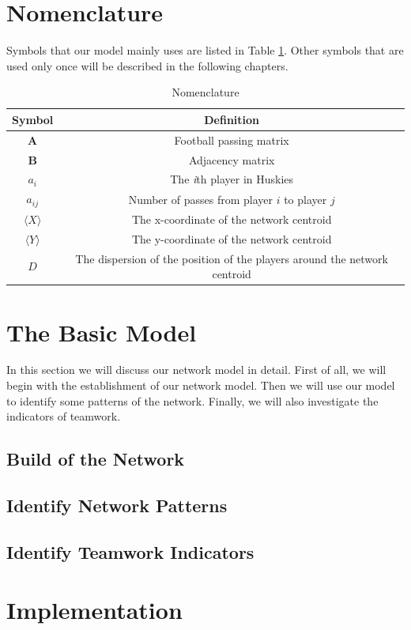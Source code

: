 \documentclass{mcmthesis}
\begin{document}
\section{Nomenclature}
	Symbols that our model mainly uses are listed in Table \ref{tab:Nomen}.  Other symbols that are used only once will be described in the following chapters.
	\begin{table}
    	\centering
    	\caption{Nomenclature}
		\label{tab:Nomen}
		\begin{tabular}{c c}
			\hline
					Symbol & Definition\\
			\hline
				$\textbf{A}$ & Football passing matrix\\
				$\textbf{B}$ & Adjacency matrix\\
				$a_{i}$ & The \emph{i}th player in Huskies\\
				$a_{ij}$ & Number of passes from player $i$ to player $j$\\
				$\langle$$X$$\rangle$ & The x-coordinate of the network centroid\\
				$\langle$$Y$$\rangle$ & The y-coordinate of the network centroid\\
				$D$ & The dispersion of the position of the players around the network centroid\\
			\hline
   	 	\end{tabular}
	\end{table}

\section{The Basic Model}
	In this section we will discuss our network model in detail.  First of all, we will begin with the establishment of our network model.  Then we will use our model to identify some patterns of the network.  Finally, we will also investigate the indicators of teamwork. 
\subsection{Build of the Network}

\subsection{Identify Network Patterns}
\subsection{Identify Teamwork Indicators}
\section{Implementation}
\end{document}
